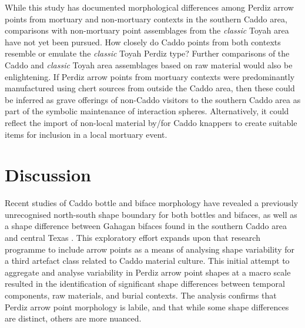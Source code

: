\documentclass[review]{elsarticle}
\begin{document}
While this study has documented morphological differences among Perdiz arrow points from mortuary and non-mortuary contexts in the southern Caddo area, comparisons with non-mortuary point assemblages from the \textit{classic} Toyah area have not yet been pursued. How closely do Caddo points from both contexts resemble or emulate the \textit{classic} Toyah Perdiz type? Further comparisons of the Caddo and \textit{classic} Toyah area assemblages based on raw material would also be enlightening. If Perdiz arrow points from mortuary contexts were predominantly manufactured using chert sources from outside the Caddo area, then these could be inferred as grave offerings of non-Caddo visitors to the southern Caddo area as part of the symbolic maintenance of interaction spheres. Alternatively, it could reflect the import of non-local material by/for Caddo knappers to create suitable items for inclusion in a local mortuary event.

\section*{Discussion}

Recent studies of Caddo bottle and biface morphology have revealed a previously unrecognised north-south shape boundary for both bottles and bifaces, as well as a shape difference between Gahagan bifaces found in the southern Caddo area and central Texas \citep{RN7162,RN5693,RN8074,RN7927,RN8158,RN8370,RN8322,RN8312}. This exploratory effort expands upon that research programme to include arrow points as a means of analysing shape variability for a third artefact class related to Caddo material culture. This initial attempt to aggregate and analyse variability in Perdiz arrow point shapes at a macro scale resulted in the identification of significant shape differences between temporal components, raw materials, and burial contexts. The analysis confirms that Perdiz arrow point morphology is labile, and that while some shape differences are distinct, others are more nuanced.
\end{document}
